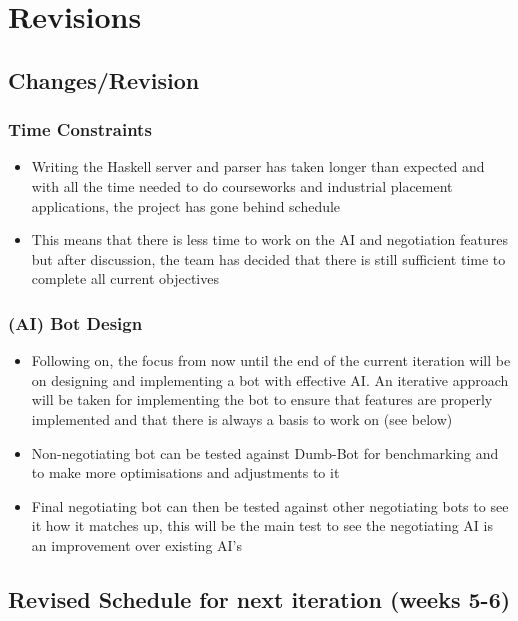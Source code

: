 \documentclass[12pt]{article}
\begin{document}
\section{Revisions}


\subsection{Changes/Revision}


\subsubsection{Time Constraints}
\begin{itemize}
\item Writing the Haskell server and parser has taken longer than expected
and with all the time needed to do courseworks and industrial placement
applications, the project has gone behind schedule
\item This means that there is less time to work on the AI and negotiation
features but after discussion, the team has decided that there is
still sufficient time to complete all current objectives
\end{itemize}

\subsubsection{(AI) Bot Design }
\begin{itemize}
\item Following on, the focus from now until the end of the current iteration
will be on designing and implementing a bot with effective AI. An
iterative approach will be taken for implementing the bot to ensure
that features are properly implemented and that there is always a
basis to work on (see below)
\item Non-negotiating bot can be tested against Dumb-Bot for benchmarking
and to make more optimisations and adjustments to it
\item Final negotiating bot can then be tested against other negotiating
bots to see it how it matches up, this will be the main test to see
the negotiating AI is an improvement over existing AI's
\end{itemize}


\subsection{Revised Schedule for next iteration (weeks 5-6)}
\end{document}

